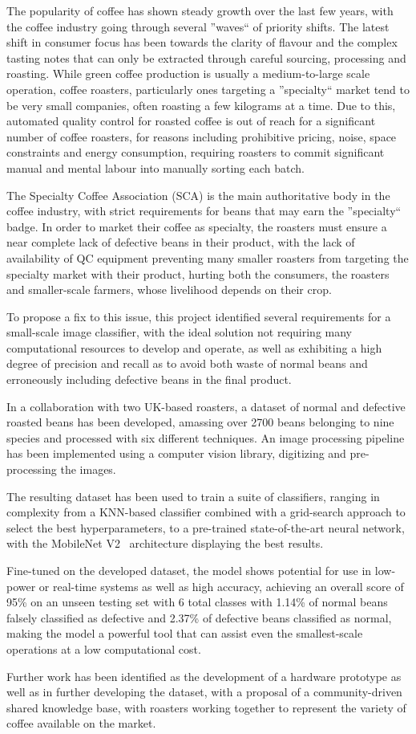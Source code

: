 The popularity of coffee has shown steady growth over the last few years,
with the coffee industry going through several ''waves`` of priority shifts.
The latest shift in consumer focus has been towards the clarity of flavour and the complex tasting notes that
can only be extracted through careful sourcing, processing and roasting.
While green coffee production is usually a medium-to-large scale operation, coffee roasters, particularly ones targeting a
''specialty`` market tend to be very small companies, often roasting a few kilograms at a time.
Due to this, automated quality control for roasted coffee is out of reach for a significant number of coffee roasters,
for reasons including prohibitive pricing, noise, space constraints and energy consumption, requiring roasters to commit
significant manual and mental labour into manually sorting each batch.

The Specialty Coffee Association (SCA) is the main authoritative body in the coffee industry, with strict requirements
for beans that may earn the ''specialty`` badge.
In order to market their coffee as specialty, the roasters must ensure a near complete lack of defective beans in their
product, with the lack of availability of QC equipment preventing many smaller roasters from targeting the specialty market with
their product, hurting both the consumers, the roasters and smaller-scale farmers, whose livelihood depends on their crop.

To propose a fix to this issue, this project identified several requirements for a small-scale image classifier,
with the ideal solution not requiring many computational resources to develop and operate, as well as exhibiting a high degree
of precision and recall as to avoid both waste of normal beans and erroneously including defective beans in the final product.

In a collaboration with two UK-based roasters, a dataset of normal and defective roasted beans has been developed, amassing
over 2700 beans belonging to nine species and processed with six different techniques.
An image processing pipeline has been implemented using a computer vision library, digitizing and pre-processing the images.

The resulting dataset has been used to train a suite of classifiers, ranging in complexity from a KNN-based classifier combined with a grid-search
approach to select the best hyperparameters, to a pre-trained state-of-the-art neural network,
with the MobileNet V2~\cite{mobileNet} architecture displaying the best results.

Fine-tuned on the developed dataset, the model shows potential for use in low-power or real-time systems as well as high accuracy,
achieving an overall score of 95\% on an unseen testing set with 6 total classes with
1.14\% of normal beans falsely classified as defective and 2.37\% of defective beans classified as normal, making the model
a powerful tool that can assist even the smallest-scale operations at a low computational cost.

Further work has been identified as the development of a hardware prototype as well as in further developing the dataset,
with a proposal of a community-driven shared knowledge base, with roasters working together to represent the variety of coffee
available on the market.
